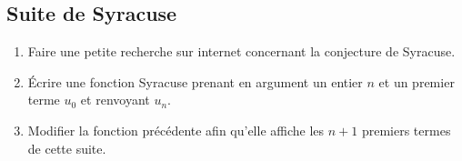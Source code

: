 \documentclass[french,11pt,twoside]{VcCours}
\begin{document}
\subsection{Suite de Syracuse}
\begin{enumerate}
\item Faire une petite recherche sur internet concernant la conjecture de Syracuse.
\item Écrire une fonction Syracuse prenant en argument un entier $n$ et un premier terme $u_0$ et renvoyant $u_n$.
\item Modifier la fonction précédente afin qu'elle affiche les $n+1$ premiers termes de cette suite.
\end{enumerate}


%
\end{document}
